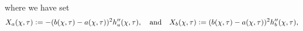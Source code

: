 %
%
where we have set
\begin{equation}
X_a(\chi,\tau) \vcentcolon= - (b(\chi,\tau)-a(\chi,\tau))^2 h_a''(\chi,\tau),\quad\text{and}\quad X_b(\chi,\tau) \vcentcolon=  (b(\chi,\tau)-a(\chi,\tau))^2 h_b''(\chi,\tau),
\end{equation}
